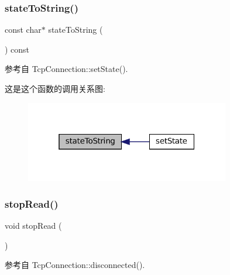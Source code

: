 \subsubsection{\texorpdfstring{state\+To\+String()}{stateToString()}}
{\footnotesize\ttfamily const char$\ast$ state\+To\+String (\begin{DoxyParamCaption}{ }\end{DoxyParamCaption}) const\hspace{0.3cm}{\ttfamily [private]}}



参考自 Tcp\+Connection\+::set\+State().

这是这个函数的调用关系图\+:
\nopagebreak
\begin{figure}[H]
\begin{center}
\leavevmode
\includegraphics[width=253pt]{classmuduo_1_1net_1_1TcpConnection_ad5814262e3c9cdcdeb4b25e9b18f9b44_icgraph}
\end{center}
\end{figure}
\mbox{\label{classmuduo_1_1net_1_1TcpConnection_a36b0d441712db3b0e94cead68e9ff10a}} 
\subsubsection{\texorpdfstring{stop\+Read()}{stopRead()}}
{\footnotesize\ttfamily void stop\+Read (\begin{DoxyParamCaption}{ }\end{DoxyParamCaption})}



参考自 Tcp\+Connection\+::disconnected().

